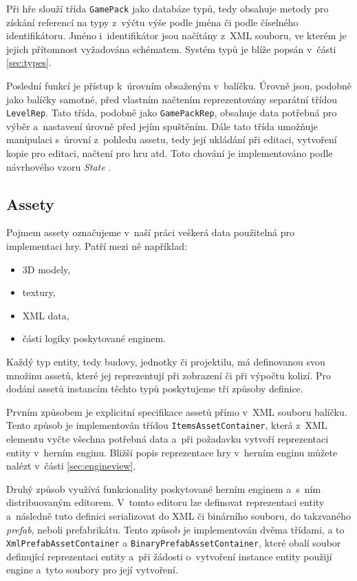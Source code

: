 Při hře slouží třída \texttt{GamePack} jako databáze typů, tedy obsahuje metody pro získání referencí na typy z~výčtu výše podle jména či podle číselného identifikátoru. Jméno i~identifikátor jsou načítány z~XML souboru, ve kterém je jejich přítomnost vyžadována schématem. Systém typů je blíže popsán v~části \ref{sec:types}.

Poslední funkcí je přístup k~úrovním obsaženým v~balíčku. Úrovně jsou, podobně jako balíčky samotné, před vlastním načtením reprezentovány separátní třídou \texttt{LevelRep}. Tato třída, podobně jako \texttt{GamePackRep}, obsahuje data potřebná pro výběr a~nastavení úrovně před jejím spuštěním. Dále tato třída umožňuje manipulaci s~úrovní z~pohledu assetu, tedy její ukládání při editaci, vytvoření kopie pro editaci, načtení pro hru atd. Toto chování je implementováno podle návrhového vzoru \textit{State} \citep[str.~305]{book:gangoffour}.

\subsection{Assety}
\label{sec:assets}
Pojmem assety označujeme v~naší práci veškerá data použitelná pro implementaci hry. Patří mezi ně například:

\begin{itemize}
	\item 3D modely,
	\item textury,
	\item XML data,
	\item části logiky poskytované enginem.
\end{itemize}

Každý typ entity, tedy budovy, jednotky či projektilu, má definovanou svou množinu assetů, které jej reprezentují při zobrazení či při výpočtu kolizí. Pro dodání assetů instancím těchto typů poskytujeme tři způsoby definice.

Prvním způsobem je explicitní specifikace assetů přímo v~XML souboru balíčku. Tento způsob je implementován třídou \texttt{ItemsAssetContainer}, která z~XML elementu vyčte všechna potřebná data a~při požadavku vytvoří reprezentaci entity v~herním enginu. Bližší popis reprezentace hry v~herním enginu můžete nalézt v~části \ref{sec:engineview}.

Druhý způsob využívá funkcionality poskytované herním enginem a~s~ním distribuovaným editorem. V~tomto editoru lze definovat reprezentaci entity a~následně tuto definici serializovat do XML či binárního souboru, do takzvaného \textit{prefab}, neboli prefabrikátu. Tento způsob je implementován dvěma třídami, a to \texttt{XmlPrefabAssetContainer} a \texttt{BinaryPrefabAssetContainer}, které obalí soubor definující reprezentaci entity a~při žádosti o~vytvoření instance entity použijí engine a~tyto soubory pro její vytvoření.


